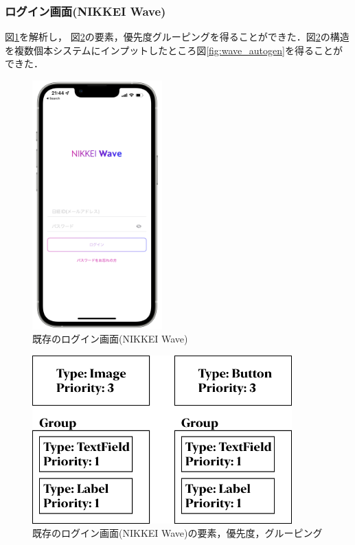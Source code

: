 \subsubsection{ログイン画面(NIKKEI Wave)}
図\ref{fig:wave_screenshot}を解析し， 図\ref{fig:wave_ViewStructure}の要素，優先度グルーピングを得ることができた．図\ref{fig:wave_ViewStructure}の構造を複数個本システムにインプットしたところ図\ref{fig:wave_autogen}を得ることができた．

\begin{figure}[htbp]
  \begin{minipage}{\hsize}
    \begin{center}
       \includegraphics[width=50mm]{img/wave_screenshot.png}
    \end{center}
    \caption{既存のログイン画面(NIKKEI Wave)}
    \label{fig:wave_screenshot}
  \end{minipage}
\end{figure}

\begin{figure}[htbp]
  \begin{minipage}{\hsize}
    \begin{center}
       \includegraphics[width=100mm]{img/wave_ViewStructure.png}
    \end{center}
    \caption{既存のログイン画面(NIKKEI Wave)の要素，優先度，グルーピング}
    \label{fig:wave_ViewStructure}
  \end{minipage}
\end{figure}

